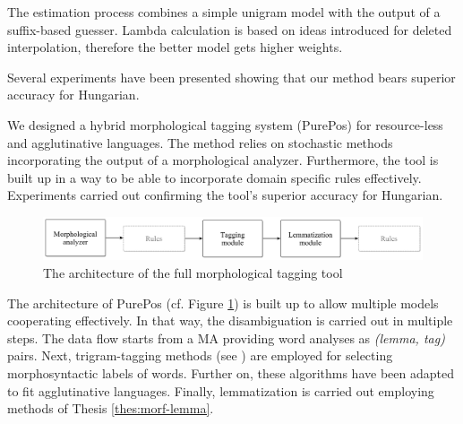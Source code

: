 The estimation process combines a simple unigram model with the output of a  suffix-based guesser. Lambda calculation is based on ideas introduced for deleted interpolation, therefore the better model gets higher weights.

Several experiments have been presented showing that our method bears superior accuracy for Hungarian. 

\thesisline%


\begin{core}
\begin{thesis}\label{thes:morf-tagging}
We designed a hybrid morphological tagging system (PurePos) for resource-less and agglutinative languages.
The method relies on stochastic methods incorporating the output of a morphological analyzer. 
Furthermore, the tool is built up in a way to be able to incorporate domain specific rules effectively.
Experiments carried out confirming the tool's superior accuracy for Hungarian.
\end{thesis}

\begin{pub}
\cite{Orosz2011,Orosz2012,Orosz2012a,Orosz2013a}
\end{pub}
\end{core}

\begin{figure}[ht] 
  \centering
  \includegraphics[width=1\textwidth]{MorphTagging/architecture.png} 
  \caption{The architecture of the full morphological tagging tool}
  \label{fig:purepos-arch_en}
\end{figure}

The architecture of PurePos (cf. Figure \ref{fig:purepos-arch_en}) is built up to allow multiple models cooperating effectively. 
In that way, the disambiguation is carried out in multiple steps.
The data flow starts from a MA providing word analyses as \emph{(lemma, tag)} pairs. 
Next, trigram-tagging methods (see \cite{Brants2000,Halacsy2007}) are employed for selecting morphosyntactic labels of words. 
Further on, these algorithms have been adapted to fit agglutinative languages.
Finally, lemmatization is carried out employing methods of Thesis \ref{thes:morf-lemma}. 


